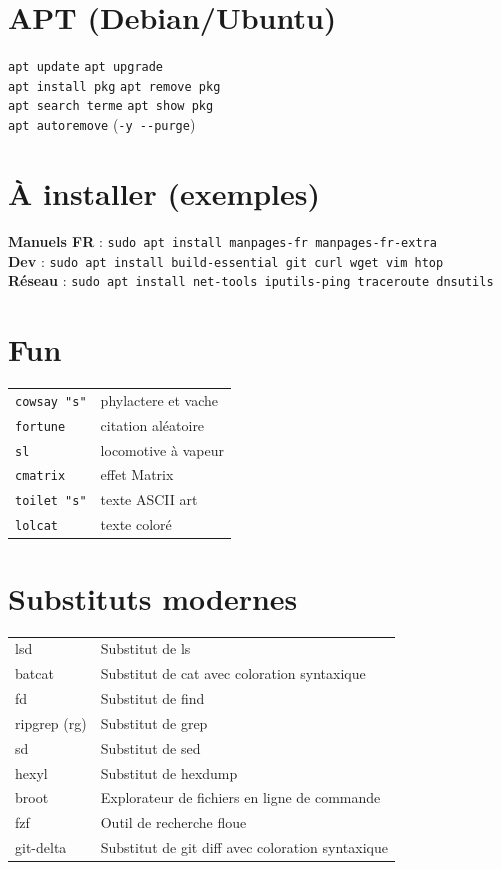 \documentclass[10pt]{article}
\begin{document}
\begin{multicols}{4}
\section*{APT (Debian/Ubuntu)}
\lstinline|apt update| \quad \lstinline|apt upgrade| \\
\lstinline|apt install pkg| \quad \lstinline|apt remove pkg| \\
\lstinline|apt search terme| \quad \lstinline|apt show pkg| \\
\lstinline|apt autoremove| (\lstinline|-y --purge|) \\


\section*{À installer (exemples)}
\textbf{Manuels FR} : \lstinline|sudo apt install manpages-fr manpages-fr-extra| \\
\textbf{Dev} : \lstinline|sudo apt install build-essential git curl wget vim htop| \\
\textbf{Réseau} : \lstinline|sudo apt install net-tools iputils-ping traceroute dnsutils| \\

\section*{Fun}

\begin{tabularx}{\columnwidth}{lX}
\lstinline|cowsay "s"| & phylactere et vache\\
\lstinline|fortune| & citation aléatoire \\
\lstinline|sl| & locomotive à vapeur \\
\lstinline|cmatrix| & effet Matrix \\
\lstinline|toilet "s"| & texte ASCII art \\
\lstinline|lolcat| & texte coloré \\
\end{tabularx}

\section*{Substituts modernes}

\begin{tabularx}{\columnwidth}{lX}
lsd & Substitut de ls  \\
batcat& Substitut de cat avec coloration syntaxique  \\
fd & Substitut de find  \\
ripgrep (rg) & Substitut de grep  \\
sd & Substitut de sed  \\
hexyl & Substitut de hexdump  \\
broot & Explorateur de fichiers en ligne de commande  \\
fzf & Outil de recherche floue  \\
git-delta & Substitut de git diff avec coloration syntaxique \\
\end{tabularx}

\end{multicols}
\end{document}
